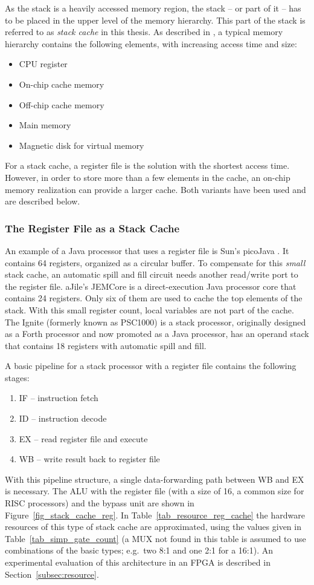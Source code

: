 As the stack is a heavily accessed memory region, the stack -- or
part of it -- has to be placed in the upper level of the memory
hierarchy. This part of the stack is referred to as \emph{stack
cache} in this thesis. As described in \cite{Hennessy02}, a typical
memory hierarchy contains the following elements, with increasing
access time and size:
%
\begin{itemize}
\item CPU register
\item On-chip cache memory
\item Off-chip cache memory
\item Main memory
\item Magnetic disk for virtual memory
\end{itemize}
%
For a stack cache, a register file is the solution with the shortest access
time. However, in order to store more than a few elements in the cache, an
on-chip memory realization can provide a larger cache. Both variants have
been used and are described below.

\subsubsection{The Register File as a Stack Cache}

An example of a Java processor that uses a register file is Sun's
picoJava \cite{pjMicroArch}. It contains 64 registers, organized as
a circular buffer. To compensate for this \emph{small} stack cache,
an automatic spill and fill circuit needs another read/write port to
the register file. aJile's JEMCore \cite{880720} is a
direct-execution Java processor core that contains 24 registers.
Only six of them are used to cache the top elements of the stack.
With this small register count, local variables are not part of the
cache. The Ignite \cite{IGNITE} (formerly known as PSC1000) is a
stack processor, originally designed as a Forth processor and now
promoted as a Java processor, has an operand stack that contains 18
registers with automatic spill and fill.

A basic pipeline for a stack processor with a register file contains the
following stages:
%
\begin{enumerate}
\item IF -- instruction fetch
\item ID -- instruction decode
\item EX -- read register file and execute
\item WB -- write result back to register file
\end{enumerate}
%
With this pipeline structure, a single data-forwarding path between
WB and EX is necessary. The ALU with the register file (with a size
of 16, a common size for RISC processors) and the bypass unit are
shown in Figure~\ref{fig_stack_cache_reg}. In
Table~\ref{tab_resource_reg_cache} the hardware resources of this
type of stack cache are approximated, using the values given in
Table~\ref{tab_simp_gate_count} (a MUX not found in this table is
assumed to use combinations of the basic types; e.g.\ two 8:1 and
one 2:1 for a 16:1). An experimental evaluation of this architecture
in an FPGA is described in Section~\ref{subsec:resource}.

